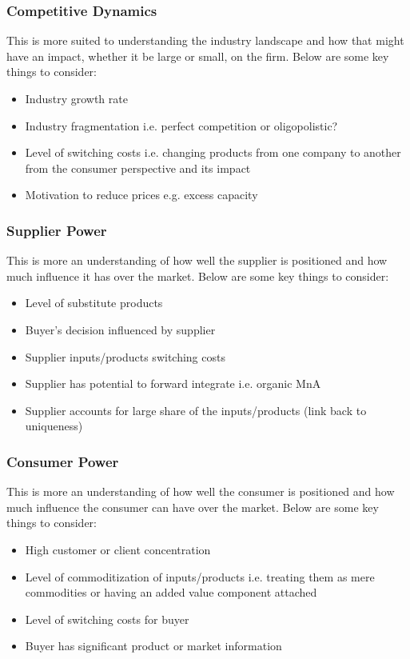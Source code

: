 \documentclass[a4paper]{article}
\begin{document}
{\subsubsection{Competitive Dynamics}
This is more suited to understanding the industry landscape and how that might have an impact, whether it be large or small, on the firm. Below are some key things to consider:

\begin{itemize}
	\item Industry growth rate
	\item Industry fragmentation i.e. perfect competition or oligopolistic?
	\item Level of switching costs i.e. changing products from one company to another from the consumer perspective and its impact
	\item Motivation to reduce prices e.g. excess capacity
\end{itemize}

\subsubsection{Supplier Power}
This is more an understanding of how well the supplier is positioned and how much influence it has over the market. Below are some key things to consider:

\begin{itemize}
	\item Level of substitute products
	\item Buyer's decision influenced by supplier
	\item Supplier inputs/products switching costs
	\item Supplier has potential to forward integrate i.e. organic MnA
	\item Supplier accounts for large share of the inputs/products (link back to uniqueness)
\end{itemize}

\subsubsection{Consumer Power}
This is more an understanding of how well the consumer is positioned and how much influence the consumer can have over the market. Below are some key things to consider:

\begin{itemize}
	\item High customer or client concentration
	\item Level of commoditization of inputs/products i.e. treating them as mere commodities or having an added value component attached
	\item Level of switching costs for buyer
	\item Buyer has significant product or market information
\end{itemize}

}
\end{document}
